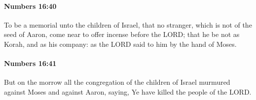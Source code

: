 		\paragraph{Numbers 16:40} %
			\label{NUMBERS-16-40}

			To be a memorial unto the children of Israel, that no stranger, which is not of the seed of Aaron, come near to offer incense before the LORD; that he be not as Korah, and as his company: as the LORD said to him by the hand of Moses.


		\paragraph{Numbers 16:41} %
			\label{NUMBERS-16-41}

			But on the morrow all the congregation of the children of Israel murmured against Moses and against Aaron, saying, Ye have killed the people of the LORD.

